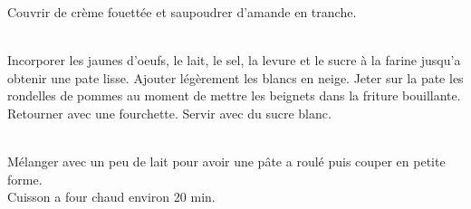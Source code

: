 \begin{minipage}[c]{\textwidth}
Couvrir de crème fouettée et saupoudrer d'amande en tranche.\\
\\

\end{minipage}

\begin{minipage}[c]{\textwidth}
Incorporer les jaunes d'oeufs, le lait, le sel, la levure et le sucre à la farine jusqu'a obtenir une pate lisse. Ajouter légèrement les blancs en neige. Jeter sur la pate les rondelles de pommes au moment de mettre les beignets dans la friture bouillante.\\
Retourner avec une fourchette. Servir avec du sucre blanc.\\
\\

\end{minipage}

\begin{minipage}[c]{\textwidth}
Mélanger avec un peu de lait pour avoir une pâte a roulé puis couper en petite forme.\\
Cuisson a four chaud environ 20 min.\\
\\

\end{minipage}

